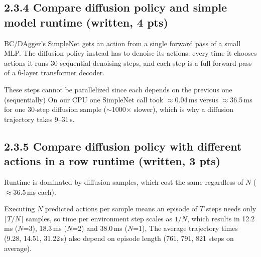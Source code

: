 \documentclass[12pt]{article}
\begin{document}
\subsection*{2.3.4 Compare diffusion policy and simple model runtime (written, 4 pts)}
\begin{tcolorbox}[fit,height=10em, width=40em, blank, borderline={1pt}{1pt},nobeforeafter]
            \begin{center}
            \begin{solution}
            \raggedright
BC/DAgger's SimpleNet gets an action from a single forward pass of a small MLP. 
The diffusion policy instead has to denoise its actions: every time it chooses actions it runs 30 sequential 
denoising steps, and each step is a full forward pass of a 6-layer transformer decoder. 

These steps cannot be parallelized since each depends on the previous one (sequentially)
On our CPU one SimpleNet call took $\approx$0.04\,ms versus $\approx$36.5\,ms for one 30-step 
diffusion sample ($\sim$1000$\times$ slower), which is why a diffusion trajectory takes 9--31\,s.

            \end{solution}
            \end{center}
            \end{tcolorbox}
\subsection*{2.3.5 Compare diffusion policy with different actions in a row runtime (written, 3 pts)}
\begin{tcolorbox}[fit,height=10em, width=40em, blank, borderline={1pt}{1pt},nobeforeafter]
            \begin{center}
            \begin{solution}
            \raggedright
Runtime is dominated by diffusion samples, which cost the same regardless of $N$ ($\approx$36.5\,ms each). 

Executing $N$ predicted actions per sample means an episode of $T$ steps needs only $\lceil T/N \rceil$ samples, 
so time per environment step scales as $1/N$, which results in 12.2\,ms ($N$=3), 18.3\,ms ($N$=2) and 38.0\,ms ($N$=1), 
The average trajectory times (9.28, 14.51, 31.22\,s) also depend on episode length (761, 791, 821 steps on average). 
            \end{solution}
            \end{center}
            \end{tcolorbox}

\clearpage
\end{document}
